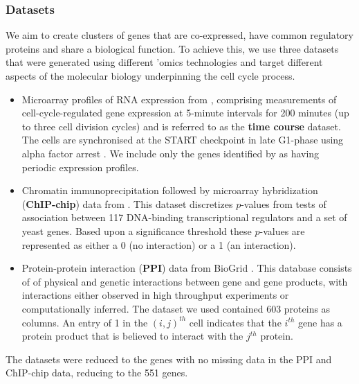 \documentclass{bioinfo}
\begin{document}
\subsubsection{Datasets}
We aim to create clusters of genes that are co-expressed, have common regulatory proteins and share a biological function. To achieve this, we use three datasets that were generated using different 'omics technologies and target different aspects of the molecular biology underpinning the cell cycle process.
\begin{itemize}
	\item Microarray profiles of RNA expression from \cite{granovskaia2010high}, comprising measurements of cell-cycle-regulated gene expression at 5-minute intervals for 200 minutes (up to three cell division cycles) and is referred to as the \textbf{time course} dataset. The cells are synchronised at the START checkpoint in late G1-phase using alpha factor arrest
	\citep{granovskaia2010high}. We include only the genes identified by \cite{granovskaia2010high} as having periodic expression profiles.
	\item Chromatin immunoprecipitation followed by microarray hybridization (\textbf{ChIP-chip}) data from \cite{harbison2004transcriptional}. This dataset discretizes $p$-values from tests of association between 117 DNA-binding transcriptional regulators and a set of yeast genes. Based upon a significance threshold these $p$-values are represented as either a 0 (no interaction) or a 1 (an interaction).
	\item Protein-protein interaction (\textbf{PPI}) data from BioGrid \citep{stark2006biogrid}. This database consists of of physical and genetic interactions between gene and gene products, with interactions either observed in high throughput experiments or computationally inferred. The dataset we used contained 603 proteins as columns. An entry of 1 in the $(i, j)^{th}$ cell indicates that the $i^{th}$ gene has a protein product that is believed to interact with the $j^{th}$ protein.
\end{itemize}
The datasets were reduced to the genes with no missing data in the PPI and ChIP-chip data, reducing to the 551 genes. %
\end{document}

